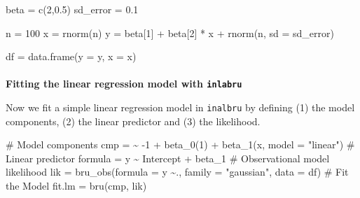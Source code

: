 \documentclass[
  letterpaper,
  DIV=11,
  numbers=noendperiod]{scrartcl}
\makeatletter
\let\oldparagraph\paragraph
\renewcommand{\paragraph}{
    \@ifstar
      \xxxParagraphStar
      \xxxParagraphNoStar
  }
\newcommand{\xxxParagraphStar}[1]{\oldparagraph*{#1}\mbox{}}
\newcommand{\xxxParagraphNoStar}[1]{\oldparagraph{#1}\mbox{}}
\newenvironment{Shaded}{\begin{snugshade}}{\end{snugshade}}
\newcommand{\AttributeTok}[1]{\textcolor[rgb]{0.40,0.45,0.13}{#1}}
\newcommand{\CommentTok}[1]{\textcolor[rgb]{0.37,0.37,0.37}{#1}}
\newcommand{\DecValTok}[1]{\textcolor[rgb]{0.68,0.00,0.00}{#1}}
\newcommand{\ErrorTok}[1]{\textcolor[rgb]{0.68,0.00,0.00}{#1}}
\newcommand{\FloatTok}[1]{\textcolor[rgb]{0.68,0.00,0.00}{#1}}
\newcommand{\FunctionTok}[1]{\textcolor[rgb]{0.28,0.35,0.67}{#1}}
\newcommand{\NormalTok}[1]{\textcolor[rgb]{0.00,0.23,0.31}{#1}}
\newcommand{\OtherTok}[1]{\textcolor[rgb]{0.00,0.23,0.31}{#1}}
\newcommand{\SpecialCharTok}[1]{\textcolor[rgb]{0.37,0.37,0.37}{#1}}
\newcommand{\StringTok}[1]{\textcolor[rgb]{0.13,0.47,0.30}{#1}}
\makeatother
\begin{document}
\begin{Shaded}
\begin{Highlighting}[]
\NormalTok{beta }\OtherTok{=} \FunctionTok{c}\NormalTok{(}\DecValTok{2}\NormalTok{,}\FloatTok{0.5}\NormalTok{)}
\NormalTok{sd\_error }\OtherTok{=} \FloatTok{0.1}

\NormalTok{n }\OtherTok{=} \DecValTok{100}
\NormalTok{x }\OtherTok{=} \FunctionTok{rnorm}\NormalTok{(n)}
\NormalTok{y }\OtherTok{=}\NormalTok{ beta[}\DecValTok{1}\NormalTok{] }\SpecialCharTok{+}\NormalTok{ beta[}\DecValTok{2}\NormalTok{] }\SpecialCharTok{*}\NormalTok{ x }\SpecialCharTok{+} \FunctionTok{rnorm}\NormalTok{(n, }\AttributeTok{sd =}\NormalTok{ sd\_error)}

\NormalTok{df }\OtherTok{=} \FunctionTok{data.frame}\NormalTok{(}\AttributeTok{y =}\NormalTok{ y, }\AttributeTok{x =}\NormalTok{ x)  }
\end{Highlighting}
\end{Shaded}

\paragraph{\texorpdfstring{\textbf{Fitting the linear regression model
with
\texttt{inlabru}}}{Fitting the linear regression model with inlabru}}\label{fitting-the-linear-regression-model-with-inlabru}

Now we fit a simple linear regression model in \texttt{inalbru} by
defining (1) the model components, (2) the linear predictor and (3) the
likelihood.

\begin{Shaded}
\begin{Highlighting}[]
\CommentTok{\# Model components}
\NormalTok{cmp }\OtherTok{=}  \ErrorTok{\textasciitilde{}} \SpecialCharTok{{-}}\DecValTok{1} \SpecialCharTok{+} \FunctionTok{beta\_0}\NormalTok{(}\DecValTok{1}\NormalTok{) }\SpecialCharTok{+} \FunctionTok{beta\_1}\NormalTok{(x, }\AttributeTok{model =} \StringTok{"linear"}\NormalTok{)}
\CommentTok{\# Linear predictor}
\NormalTok{formula }\OtherTok{=}\NormalTok{ y }\SpecialCharTok{\textasciitilde{}}\NormalTok{ Intercept }\SpecialCharTok{+}\NormalTok{ beta\_1}
\CommentTok{\# Observational model likelihood}
\NormalTok{lik }\OtherTok{=}  \FunctionTok{bru\_obs}\NormalTok{(}\AttributeTok{formula =}\NormalTok{ y }\SpecialCharTok{\textasciitilde{}}\NormalTok{.,}
            \AttributeTok{family =} \StringTok{"gaussian"}\NormalTok{,}
            \AttributeTok{data =}\NormalTok{ df)}
\CommentTok{\# Fit the Model}
\NormalTok{fit.lm }\OtherTok{=} \FunctionTok{bru}\NormalTok{(cmp, lik)}
\end{Highlighting}
\end{Shaded}
\end{document}

